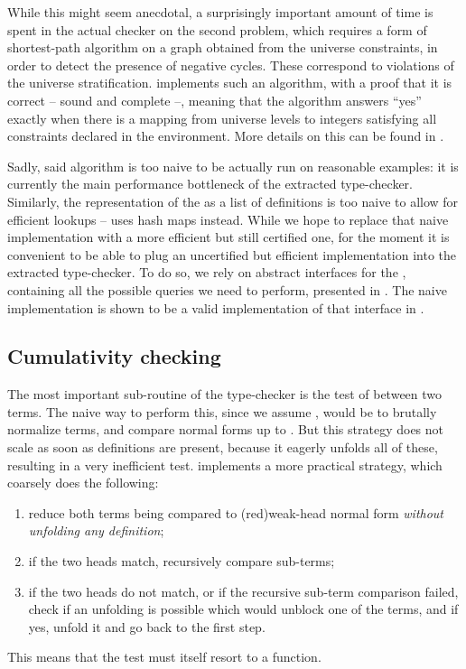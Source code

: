 While this might seem anecdotal,
a surprisingly important amount of time is spent in the actual checker
on the second problem, which requires a form of shortest-path algorithm
on a graph obtained from the universe constraints, in order
to detect the presence of negative cycles.
These correspond to violations of the universe stratification.
 implements such an algorithm, with a proof that it is correct – \ie sound and complete –, meaning that
the algorithm answers “yes” exactly when there is a mapping from universe levels to integers satisfying
all constraints declared in the environment.
More details on this can be found in .

Sadly, said algorithm is too naive to be actually run on reasonable examples: it is currently the main
performance bottleneck of the extracted type-checker. Similarly, the representation of the
 as a list of definitions is too naive to allow for efficient lookups –
 uses hash maps instead.
While we hope to replace that naive implementation with a more efficient but still certified one,
for the moment it is convenient to be able to plug an uncertified but efficient implementation
into the extracted type-checker. To do so, we rely on abstract interfaces for the
, containing all the possible queries we need to perform,
presented in . The naive implementation is shown to be a valid implementation of
that interface in .

\subsection{Cumulativity checking}

The most important sub-routine of the type-checker is the test of  between two terms.
The naive way to perform this, since we assume , would be to brutally normalize terms,
and compare normal forms up to .%
But this strategy does not scale as soon as definitions are present, because it
eagerly unfolds all of these, resulting in a very inefficient test.
 implements a more practical strategy, which coarsely does the following:
\begin{enumerate}
  \item reduce both terms being compared to \kl(red){weak-head} normal form
    \emph{without unfolding any definition};
  \item if the two heads match, recursively compare sub-terms;
  \item if the two heads do not match, or if the recursive sub-term comparison failed, check if
    an unfolding is possible which would unblock one of the terms, and if yes, unfold it and
    go back to the first step.
\end{enumerate}
This means that the  test must itself resort to a 
function.

